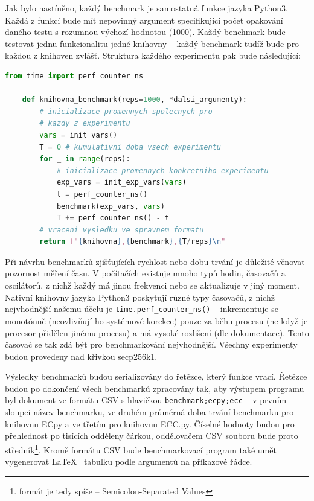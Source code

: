 \documentclass{article}
\theoremstyle{definition}
\begin{document}
Jak bylo nastíněno, každý benchmark je samostatná funkce jazyka Python3. Každá z funkcí bude mít nepovinný argument specifikující počet opakování daného testu s rozumnou výchozí hodnotou (1000). Každý benchmark bude testovat jednu funkcionalitu jedné knihovny -- každý benchmark tudíž bude  pro každou z knihoven zvlášť. Struktura každého experimentu pak bude následující:

\begin{lstlisting}[language=Python, caption=Struktura Experimentu]
    from time import perf_counter_ns
    
    def knihovna_benchmark(reps=1000, *dalsi_argumenty):
        # inicializace promennych spolecnych pro
        # kazdy z experimentu
        vars = init_vars()
        T = 0 # kumulativni doba vsech experimentu
        for _ in range(reps):
            # inicializace promennych konkretniho experimentu
            exp_vars = init_exp_vars(vars)
            t = perf_counter_ns()
            benchmark(exp_vars, vars)
            T += perf_counter_ns() - t
        # vraceni vysledku ve spravnem formatu
        return f"{knihovna},{benchmark},{T/reps}\n"
\end{lstlisting}

Při návrhu benchmarků zjišťujících rychlost nebo dobu trvání je důležité věnovat pozornost měření času. V počítačích existuje mnoho typů hodin, časovačů a oscilátorů, z nichž každý má jinou frekvenci nebo se aktualizuje v jiný moment. Nativní knihovny jazyka Python3 poskytují různé typy časovačů, z nichž nejvhodnější našemu účelu je \verb|time.perf_counter_ns()| -- inkrementuje se monotónně (neovlivňují ho systémové korekce) pouze za běhu procesu (ne když je procesor přidělen jinému procesu) a má vysoké rozlišení (dle dokumentace). Tento časovač se tak zdá být pro benchmarkování nejvhodnější. Všechny experimenty budou provedeny nad křivkou secp256k1. 

Výsledky benchmarků budou serializovány do řetězce, který funkce vrací. Řetězce budou po dokončení všech benchmarků zpracovány tak, aby výstupem programu byl dokument ve formátu CSV s hlavičkou \verb|benchmark;ecpy;ecc| -- v prvním sloupci název benchmarku, ve druhém průměrná doba trvání benchmarku pro knihovnu ECpy a ve třetím pro knihovnu ECC.py. Číselné hodnoty budou pro přehlednost po tisících odděleny čárkou, oddělovačem CSV souboru bude proto středník\footnote{formát je tedy spíše  -- Semicolon-Separated Values}. Kromě formátu CSV bude benchmarkovací program také umět vygenerovat \LaTeX ~ tabulku podle argumentů na příkazové řádce.
\end{document}
